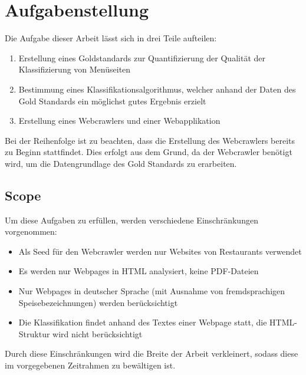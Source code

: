 \chapter{Aufgabenstellung}
Die Aufgabe dieser Arbeit lässt sich in drei Teile aufteilen:
\begin{enumerate}
	\item Erstellung eines Goldstandards zur Quantifizierung der Qualität der Klassifizierung von Menüseiten
	\item Bestimmung eines Klassifikationsalgorithmus, welcher anhand der Daten des Gold Standards ein möglichst gutes Ergebnis erzielt
	\item Erstellung eines Webcrawlers und einer Webapplikation
\end{enumerate}
Bei der Reihenfolge ist zu beachten, dass die Erstellung des Webcrawlers bereits zu Beginn stattfindet.
Dies erfolgt aus dem Grund, da der Webcrawler benötigt wird, um die Datengrundlage des Gold Standards zu erarbeiten.
\section{Scope}
\label{chap:scope}
Um diese Aufgaben zu erfüllen, werden verschiedene Einschränkungen vorgenommen:
\begin{itemize}
	\item Als Seed für den Webcrawler werden nur Websites von Restaurants verwendet
	\item Es werden nur Webpages in HTML analysiert, keine PDF-Dateien
	\item Nur Webpages in deutscher Sprache (mit Ausnahme von fremdsprachigen Speisebezeichnungen) werden berücksichtigt
	\item Die Klassifikation findet anhand des Textes einer Webpage statt, die HTML-Struktur wird nicht berücksichtigt
\end{itemize}
Durch diese Einschränkungen wird die Breite der Arbeit verkleinert, sodass diese im vorgegebenen Zeitrahmen zu bewältigen ist.
